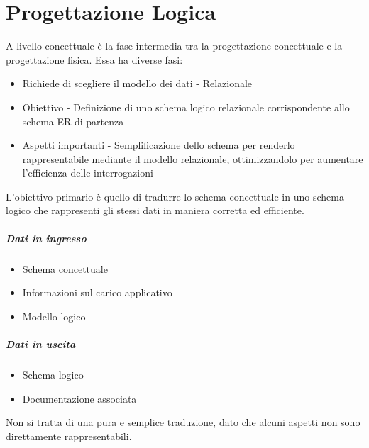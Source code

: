\chapter{Progettazione Logica}
A livello concettuale è la fase intermedia tra la progettazione concettuale e la progettazione fisica.
Essa ha diverse fasi:
\begin{itemize}
    \item Richiede di scegliere il modello dei dati - Relazionale
    \item Obiettivo - Definizione di uno schema logico relazionale corrispondente allo
    schema ER di partenza
    \item Aspetti importanti - Semplificazione dello schema per renderlo rappresentabile
    mediante il modello relazionale, ottimizzandolo per aumentare l'efficienza delle
    interrogazioni
\end{itemize}
L'obiettivo primario è quello di tradurre lo schema concettuale in uno schema logico
che rappresenti gli stessi dati in maniera corretta ed efficiente.\\
\paragraph*{Dati in ingresso}
\begin{itemize}
    \item Schema concettuale
    \item Informazioni sul carico applicativo
    \item Modello logico
\end{itemize}
\paragraph*{Dati in uscita}
\begin{itemize}
    \item Schema logico
    \item Documentazione associata
\end{itemize}
Non si tratta di una pura e semplice traduzione, dato che alcuni aspetti non
sono direttamente rappresentabili.
